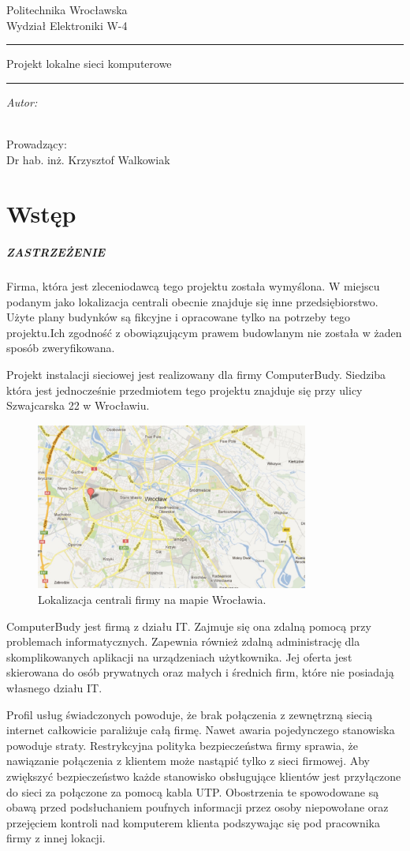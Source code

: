 \documentclass{report}
\author{Mateusz Socha 181308 \\ Janusz Kuszczyński 184872 }
\title{}
\makeatletter
\newcommand{\linia}{\rule{\linewidth}{0.4mm}}
\renewcommand{\maketitle}{\begin{titlepage}

    \vspace*{1cm}

    \begin{center}\small

    Politechnika Wrocławska\\

    Wydział Elektroniki W-4\\

    \end{center}

    \vspace{3cm}

    \noindent\linia

    \begin{center}

      \LARGE Projekt lokalne sieci komputerowe\\
      \normalsize\textsc{\@title}

         \end{center}

     \noindent\linia

    \vspace{0.5cm}

    \begin{flushright}

    \begin{minipage}{6cm}

    \textit{\small Autor:}\\

    \normalsize \textsc{\@author} \\

    \end{minipage}

    \vspace{5cm}

     {\small Prowadzący:}\\

         Dr hab. inż. Krzysztof Walkowiak

     \end{flushright}

    \vspace*{\stretch{6}}

    \begin{center}

    \@date

    \end{center}

  \end{titlepage}

}
\makeatother
\begin{document}
\maketitle
\tableofcontents

\chapter{Wstęp}
\paragraph{ZASTRZEŻENIE}
Firma, która jest zleceniodawcą tego projektu została wymyślona.
W miejscu podanym jako lokalizacja centrali obecnie znajduje się inne przedsiębiorstwo. Użyte plany budynków są fikcyjne i opracowane tylko na 
potrzeby tego projektu.Ich zgodność z obowiązującym prawem budowlanym nie została w żaden sposób zweryfikowana.

\vspace{0,5cm}
Projekt instalacji sieciowej jest realizowany dla firmy ComputerBudy. Siedziba która jest jednocześnie przedmiotem tego projektu znajduje się
przy ulicy Szwajcarska 22 w Wrocławiu.

\begin{figure}[h!]
  \centering
      \includegraphics[width=0.8\textwidth]{./obrazki/adres_computerbudy.jpeg}
  \caption{Lokalizacja centrali firmy na mapie Wrocławia.}
\end{figure}

ComputerBudy jest firmą z działu IT. Zajmuje się ona zdalną pomocą przy problemach informatycznych. Zapewnia również zdalną administrację dla
skomplikowanych aplikacji na urządzeniach użytkownika. Jej oferta jest skierowana do osób prywatnych oraz małych i średnich firm, które
nie posiadają własnego działu IT.

Profil usług świadczonych powoduje, że brak połączenia z zewnętrzną siecią internet całkowicie paraliżuje całą firmę. 
Nawet awaria pojedynczego stanowiska powoduje straty. Restrykcyjna polityka bezpieczeństwa firmy sprawia, że nawiązanie połączenia z klientem
może nastąpić tylko z sieci firmowej. Aby zwiększyć bezpieczeństwo każde stanowisko obsługujące klientów jest przyłączone do sieci
za połączone za pomocą kabla UTP. Obostrzenia te spowodowane są obawą przed podsłuchaniem poufnych informacji przez osoby niepowołane oraz
przejęciem kontroli nad komputerem klienta podszywając się pod pracownika firmy z innej lokacji.
\end{document}
